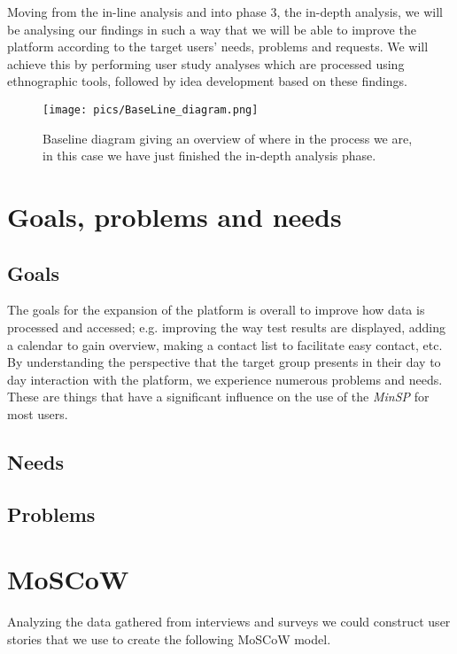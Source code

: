 \documentclass[a4paper,11pt]{article}
\begin{document}
Moving from the in-line analysis and into phase 3, the in-depth analysis, we will be analysing our findings in such a way that we will be able to improve the platform according to the target users’ needs, problems and requests. We will achieve this by performing user study analyses which are processed using ethnographic tools, followed by idea development based on these findings.
\begin{figure}[H]
    \hspace*{-1.25cm}
    \texttt{[image: pics/BaseLine\_diagram.png]}
    \caption{Baseline diagram giving an overview of where in the process we are, in this case we have just finished the in-depth analysis phase.}
    \label{fig:my_label}
\end{figure}

\section{Goals, problems and needs}

\subsection{Goals}
The goals for the expansion of the platform is overall to improve how data is processed and accessed; e.g. improving the way test results are displayed, adding a calendar to gain overview, making a contact list to facilitate easy contact, etc.
By understanding the perspective that the target group presents in their day to day interaction with the platform, we experience numerous problems and needs. These are things that have a significant influence on the use of the \textit{MinSP} for most users. 

\subsection{Needs}

\subsection{Problems}

\section{MoSCoW}
Analyzing the data gathered from interviews and surveys we could construct user stories that we use to create the following MoSCoW model.
\end{document}
